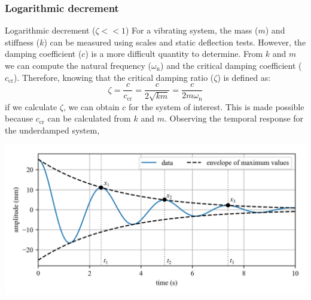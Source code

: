 \documentclass[12pt,letter]{article}
\begin{document}
\subsubsection{Logarithmic decrement}



Logarithmic decrement ($\zeta << 1$) For a vibrating system, the  mass ($m$) and stiffness ($k$) can be measured using scales and static deflection tests. However, the damping coefficient ($c$) is a more difficult quantity to determine. From $k$ and $m$ we can compute the natural frequency ($\omega_\text{n}$) and the critical damping coefficient ($c_\text{cr}$). Therefore, knowing that the critical damping ratio ($\zeta$) is defined as:
			\begin{equation}
				\zeta = \frac{c}{c_{\text{cr}}} = \frac{c}{2\sqrt{km}} = \frac{c}{2m\omega_\text{n}}
			\end{equation}				
			if we calculate $\zeta$, we can obtain $c$ for the system of interest. This is made possible because $c_\text{cr}$ can be calculated from $k$ and $m$. Observing the temporal response for the underdamped system, 

	        \begin{minipage}{\linewidth}
	            \centering
	            \includegraphics[width=\linewidth]{../figures/Logarithmic_decrement.png}
	        \end{minipage}
			
\end{document}

